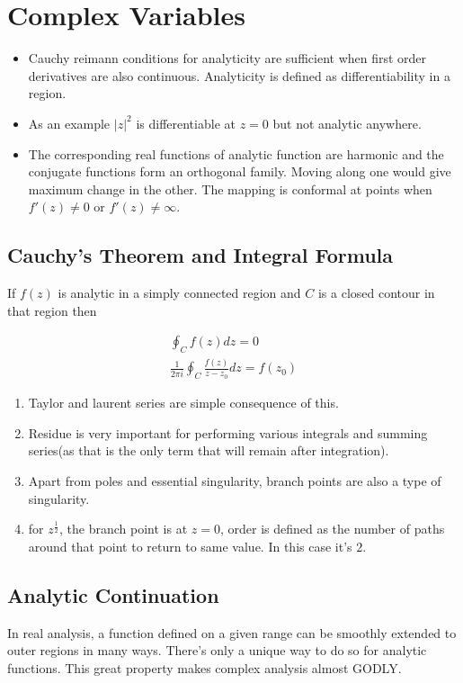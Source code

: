 \documentclass{report}
\begin{document}
\chapter{Complex Variables}

\begin{itemize}

  \item Cauchy reimann conditions for analyticity are sufficient when first order derivatives are also continuous. Analyticity is defined as differentiability in a region. 

  \item As an example $|z|^2$ is differentiable at $z=0$ but not analytic anywhere.

  \item The corresponding real functions of analytic function are harmonic and the conjugate functions form an orthogonal family. Moving along one would give maximum change in the other. The mapping is conformal at points when $f'(z) \neq 0$ or $f'(z) \neq \infty$.

\end{itemize}

\section{Cauchy's Theorem and Integral Formula} If $f(z)$ is analytic in a simply connected region and $C$ is a closed contour in that region then

\begin{gather}
\oint_{C}f(z)dz = 0\\
\frac{1}{2\pi i}\oint_{C}\frac{f(z)}{z-z_0}dz = f(z_0)
\end{gather}

\begin{enumerate}
  \item Taylor and laurent series are simple consequence of this.
  \item Residue is very important for performing various integrals and summing series(as that is the only term that will remain after integration). 
  \item Apart from poles and essential singularity, branch points are also a type of singularity.
  \item for $z^\frac{1}{2}$, the branch point is at $z=0$, order is defined as the number of paths around that point to return to same value. In this case it's $2$.
\end{enumerate}


\section{Analytic Continuation}
In real analysis, a function defined on a given range can be smoothly extended to outer regions in many ways. There's only a unique way to do so for analytic functions. This great property makes complex analysis almost GODLY.\\
\end{document}
